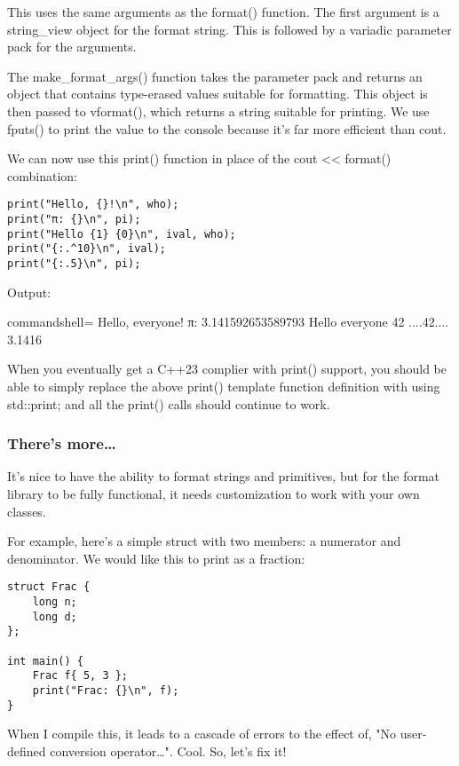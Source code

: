 This uses the same arguments as the format() function. The first argument is a string\_view object for the format string. This is followed by a variadic parameter pack for the arguments.

The make\_format\_args() function takes the parameter pack and returns an object that contains type-erased values suitable for formatting. This object is then passed to vformat(), which returns a string suitable for printing. We use fputs() to print the value to the console because it's far more efficient than cout.

We can now use this print() function in place of the cout << format() combination:

\begin{lstlisting}[style=styleCXX]
print("Hello, {}!\n", who);
print("π: {}\n", pi);
print("Hello {1} {0}\n", ival, who);
print("{:.^10}\n", ival);
print("{:.5}\n", pi);
\end{lstlisting}

Output:

\begin{tcblisting}{commandshell={}}
Hello, everyone!
π: 3.141592653589793
Hello everyone 42
....42....
3.1416
\end{tcblisting}

When you eventually get a C++23 complier with print() support, you should be able to simply replace the above print() template function definition with using std::print; and all the print() calls should continue to work.

\subsubsection{There's more…}

It's nice to have the ability to format strings and primitives, but for the format library to be fully functional, it needs customization to work with your own classes.

For example, here's a simple struct with two members: a numerator and denominator. We would like this to print as a fraction:

\begin{lstlisting}[style=styleCXX]
struct Frac {
	long n;
	long d;
};

int main() {
	Frac f{ 5, 3 };
	print("Frac: {}\n", f);
}
\end{lstlisting}

When I compile this, it leads to a cascade of errors to the effect of, "No user-defined conversion operator…". Cool. So, let's fix it!

